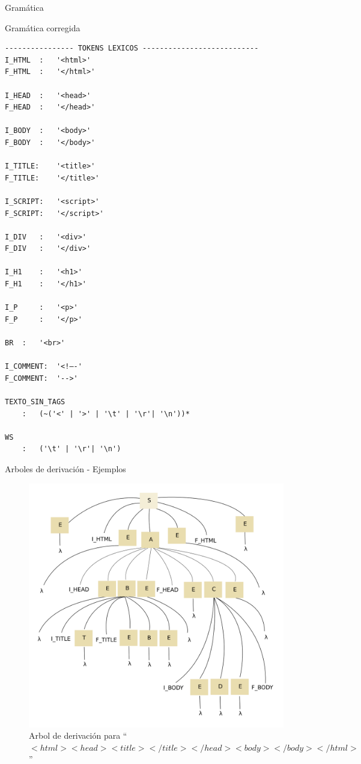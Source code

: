 \documentclass[a4paper,8pt]{article}
\begin{document}
\begin{section}{Gramática}
\begin{subsection}{Gramática corregida}
\begin{verbatim}
---------------- TOKENS LEXICOS ---------------------------
I_HTML 	:	'<html>' 
F_HTML 	:	'</html>' 

I_HEAD 	:	'<head>'  
F_HEAD 	:	'</head>' 

I_BODY 	:	'<body>' 
F_BODY 	:	'</body>'

I_TITLE:	'<title>'  
F_TITLE:	'</title>' 
	
I_SCRIPT:	'<script>'  
F_SCRIPT:	'</script>' 
	
I_DIV 	:	'<div>' 
F_DIV 	:	'</div>' 
	
I_H1 	:	'<h1>'  
F_H1 	:	'</h1>' 
	
I_P 	:	'<p>'
F_P 	:	'</p>' 

BR 	:	'<br>'

I_COMMENT:	'<!–-'
F_COMMENT:	'-->'

TEXTO_SIN_TAGS 
	:	(~('<' | '>' | '\t' | '\r'| '\n'))* 

WS 
    :   ('\t' | '\r'| '\n') 

\end{verbatim}
\bigskip
\newpage
 \begin{subsubsection}{Arboles de derivación - Ejemplos}
    \begin{figure}[h!]
      \centering
      \includegraphics[scale=0.40]{ejemplo1.png}

      \caption{Arbol de derivación para ``$<html><head><title></title></head><body></body></html>$''}
    \end{figure}


\end{subsubsection}
\end{subsection}
\end{section}
\end{document}
